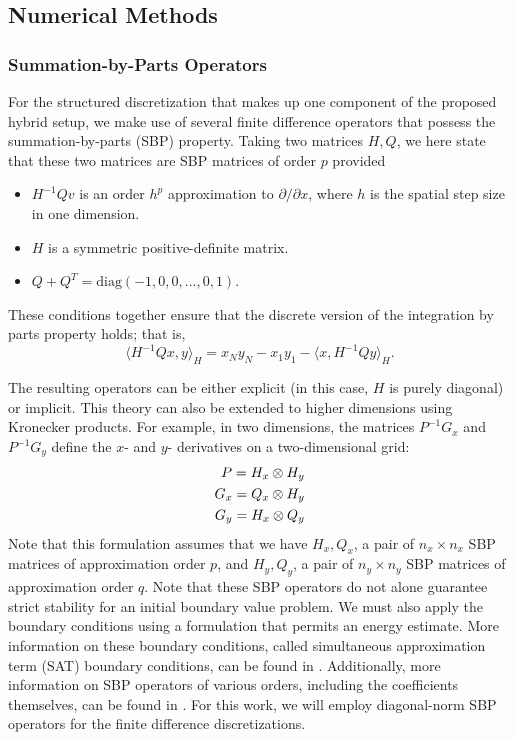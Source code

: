 \subsection{Numerical Methods}

\subsubsection{Summation-by-Parts Operators}

For the structured discretization that makes up one component of the proposed hybrid setup, we make use of several
finite difference operators that possess the summation-by-parts (SBP) property. Taking two matrices
${H,Q}$, we here state that these two matrices are SBP matrices of order $p$ provided 
\begin{itemize}
\item $H^{-1}Q v$ is an order $h^{p}$ approximation to $\partial/\partial x$, where $h$ is the spatial step size in one dimension.
\item $H$ is a symmetric positive-definite matrix.
\item $Q + Q^{T} = \text{diag}(-1,0,0,...,0,1)$.
\end{itemize}
These conditions together ensure that the discrete version of the integration by parts property holds; that is,
\[\langle H^{-1}Q x , y\rangle_{H} = x_{N} y_{N} -  x_{1} y_{1} - \langle x,H^{-1}Q y\rangle _{H}. \]

The resulting operators can be either explicit (in this case, $H$ is purely diagonal) or implicit.
This theory can also be extended to higher
dimensions using Kronecker products.  For example, in two dimensions, the matrices $P^{-1} G_x$
and $P^{-1} G_y$ define the $x$- and $y$- derivatives on a two-dimensional grid:
\begin{align}
P = H_{x} \otimes H_{y} \notag \\
G_{x} = Q_{x} \otimes H_{y} \notag \\
G_{y} = H_{x} \otimes Q_{y} \notag
\end{align}
Note that this formulation assumes that we have ${H_{x},Q_{x}}$, a pair of $n_{x} \times n_{x}$ SBP
matrices of approximation order $p$, and ${H_{y},Q_{y}}$, a pair of $n_{y} \times n_{y}$ SBP matrices
of approximation order $q$.
Note that these SBP operators do not alone guarantee strict
stability for an initial boundary value problem. We must also apply the boundary conditions using a
formulation that permits an energy estimate. More information on these boundary conditions, called
simultaneous approximation term (SAT) boundary conditions, can be found in \cite{svard2007stable,
svard2008stable, bodony2010accuracy}. Additionally, more information on SBP operators
of various orders, including the coefficients themselves, can be found
in \cite{strand1994summation, carpenter1993time, mattsson2004stable}. For this work,
we will employ diagonal-norm SBP operators for the finite difference discretizations.

